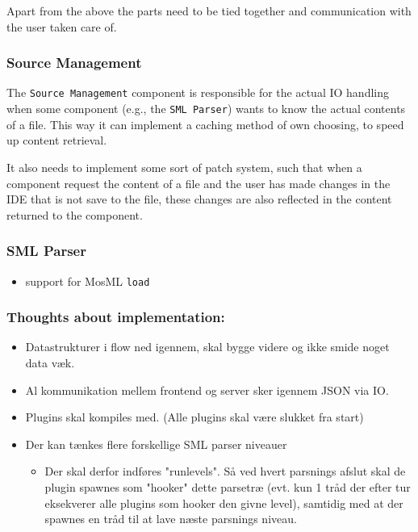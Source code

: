 \documentclass[a4paper,oneside]{memoir}
\begin{document}
Apart from the above the parts need to be tied together and communication with the user taken care
of.


\subsubsection{Source Management}

The \texttt{Source Management} component is responsible for the actual IO handling when
some component (e.g., the \texttt{SML Parser}) wants to know the actual contents
of a file. This way it can implement a caching method of own choosing, to speed
up content retrieval.

It also needs to implement some sort of patch system, such that when a component
request the content of a file and the user has made changes in the IDE that is
not save to the file, these changes are also reflected in the content returned
to the component. 


\subsubsection{SML Parser}


\begin{itemize}

\item support for MosML \texttt{load}


\end{itemize}


\subsubsection{Thoughts about implementation:}
\begin{itemize}
\item Datastrukturer i flow ned igennem, skal bygge videre og ikke smide noget
  data væk.

\item Al kommunikation mellem frontend og server sker igennem JSON via IO.

\item Plugins skal kompiles med. (Alle plugins skal være slukket fra start)


\item Der kan tænkes flere forskellige SML parser niveauer 
  \begin{itemize}

  \item Der skal derfor indføres "runlevels". Så ved hvert parsnings afslut skal
    de plugin spawnes som "hooker" dette parsetræ (evt. kun 1 tråd der efter tur
    eksekverer alle plugins som hooker den givne level), samtidig med at der
    spawnes en tråd til at lave næste parsnings niveau.
  \end{itemize}
\end{itemize}
\end{document}
